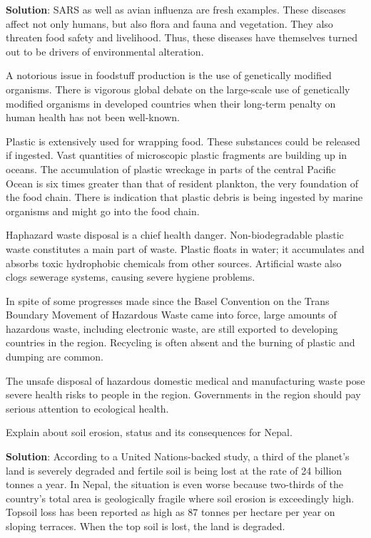 \documentclass[
]{book}
\newcommand{\question}{\item}
\newenvironment{solution}{ {\bfseries Solution}:}{}
\begin{document}
\begin{questions}
\begin{solution}
SARS as well as avian influenza are fresh examples. These diseases affect not only humans, but also flora and fauna and vegetation. They also threaten food safety and livelihood. Thus, these diseases have themselves turned out to be drivers of environmental alteration.

A notorious issue in foodstuff production is the use of genetically modified organisms. There is vigorous global debate on the large-scale use of genetically modified organisms in developed countries when their long-term penalty on human health has not been well-known.

Plastic is extensively used for wrapping food. These substances could be released if ingested. Vast quantities of microscopic plastic fragments are building up in oceans. The accumulation of plastic wreckage in parts of the central Pacific Ocean is six times greater than that of resident plankton, the very foundation of the food chain. There is indication that plastic debris is being ingested by marine organisms and might go into the food chain.

Haphazard waste disposal is a chief health danger. Non-biodegradable plastic waste constitutes a main part of waste. Plastic floats in water; it accumulates and absorbs toxic hydrophobic chemicals from other sources. Artificial waste also clogs sewerage systems, causing severe hygiene problems.

In spite of some progresses made since the Basel Convention on the Trans Boundary Movement of Hazardous Waste came into force, large amounts of hazardous waste, including electronic waste, are still exported to developing countries in the region. Recycling is often absent and the burning of plastic and dumping are common.

The unsafe disposal of hazardous domestic medical and manufacturing waste pose severe health risks to people in the region. Governments in the region should pay serious attention to ecological health.

\end{solution}

\question Explain about soil erosion, status and its consequences for Nepal. 

\begin{solution}
According to a United Nations-backed study, a third of the planet's land is severely degraded and fertile soil is being lost at the rate of 24 billion tonnes a year. In Nepal, the situation is even worse because two-thirds of the country's total area is geologically fragile where soil erosion is exceedingly high. Topsoil loss has been reported as high as 87 tonnes per hectare per year on sloping terraces. When the top soil is lost, the land is degraded.


\end{solution}
\end{questions}
\end{document}
